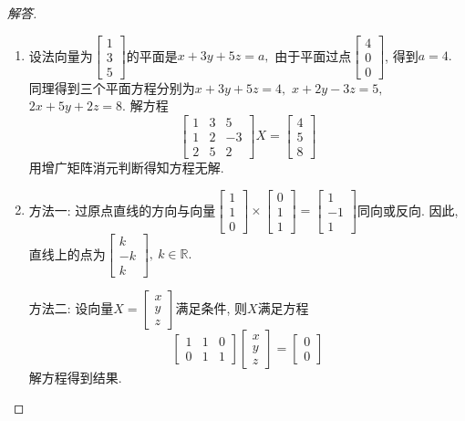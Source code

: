 \documentclass[UTF8]{ctexart}
\begin{document}
\begin{proof}[解答]
\begin{enumerate}
\item 设法向量为$\begin{bmatrix}
				1 \\  3\\  5
			\end{bmatrix}$的平面是$x+3y+5z = a,$ 由于平面过点$\begin{bmatrix}
				4 \\  0\\  0
			\end{bmatrix}$, 得到$a = 4.$ 同理得到三个平面方程分别为$x+3y+5z = 4,$ $x + 2y -3z = 5,$ $2x + 5y +2z = 8.$ 解方程
\[
\begin{bmatrix}
				1 & 3 & 5 \\  1 & 2 & -3\\  2& 5 & 2
			\end{bmatrix} X= \begin{bmatrix}
				4 \\  5\\  8
			\end{bmatrix}
\]
用增广矩阵消元判断得知方程无解.

\item 方法一: 过原点直线的方向与向量$\begin{bmatrix}
				1 \\  1\\  0
			\end{bmatrix}\times \begin{bmatrix}
				0 \\  1\\  1
			\end{bmatrix} = \begin{bmatrix}
				1 \\  -1\\  1
			\end{bmatrix}$同向或反向. 因此, 直线上的点为$\begin{bmatrix}
				k \\  -k\\  k
			\end{bmatrix}, ~ k\in \mathbb{R}.$

方法二: 设向量$X= \begin{bmatrix}
				x \\  y\\  z
			\end{bmatrix}$满足条件, 则$X$满足方程
\[
 \begin{bmatrix}
				1 & 1 & 0 \\  0 & 1 & 1
			\end{bmatrix} \begin{bmatrix}
				x \\  y\\  z
			\end{bmatrix} =  \begin{bmatrix}
				0 \\  0
			\end{bmatrix}
\]
解方程得到结果.


\end{enumerate}
\end{proof}
\end{document}
